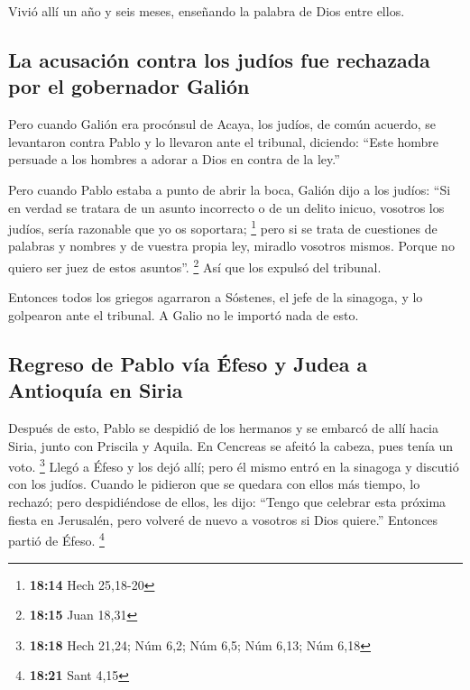 \begin{paracol}{2}
 Vivió allí un año y seis meses, enseñando la palabra de
Dios entre ellos.

\hypertarget{la-acusaciuxf3n-contra-los-juduxedos-fue-rechazada-por-el-gobernador-galiuxf3n}{%
\subsection{La acusación contra los judíos fue rechazada por el
gobernador
Galión}\label{la-acusaciuxf3n-contra-los-juduxedos-fue-rechazada-por-el-gobernador-galiuxf3n}}

 Pero cuando Galión era procónsul de Acaya, los judíos,
de común acuerdo, se levantaron contra Pablo y lo llevaron ante el
tribunal,  diciendo: ``Este hombre persuade a los hombres
a adorar a Dios en contra de la ley.''

 Pero cuando Pablo estaba a punto de abrir la boca,
Galión dijo a los judíos: ``Si en verdad se tratara de un asunto
incorrecto o de un delito inicuo, vosotros los judíos, sería razonable
que yo os soportara; \footnote{\textbf{18:14} Hech 25,18-20}
 pero si se trata de cuestiones de palabras y nombres y
de vuestra propia ley, miradlo vosotros mismos. Porque no quiero ser
juez de estos asuntos''. \footnote{\textbf{18:15} Juan 18,31}
 Así que los expulsó del tribunal.

 Entonces todos los griegos agarraron a Sóstenes, el jefe
de la sinagoga, y lo golpearon ante el tribunal. A Galio no le importó
nada de esto.

\hypertarget{regreso-de-pablo-vuxeda-uxe9feso-y-judea-a-antioquuxeda-en-siria}{%
\subsection{Regreso de Pablo vía Éfeso y Judea a Antioquía en
Siria}\label{regreso-de-pablo-vuxeda-uxe9feso-y-judea-a-antioquuxeda-en-siria}}

 Después de esto, Pablo se despidió de los hermanos y se
embarcó de allí hacia Siria, junto con Priscila y Aquila. En Cencreas se
afeitó la cabeza, pues tenía un voto. \footnote{\textbf{18:18} Hech
  21,24; Núm 6,2; Núm 6,5; Núm 6,13; Núm 6,18}  Llegó a
Éfeso y los dejó allí; pero él mismo entró en la sinagoga y discutió con
los judíos.  Cuando le pidieron que se quedara con ellos
más tiempo, lo rechazó;  pero despidiéndose de ellos, les
dijo: ``Tengo que celebrar esta próxima fiesta en Jerusalén, pero
volveré de nuevo a vosotros si Dios quiere.'' Entonces partió de Éfeso.
\footnote{\textbf{18:21} Sant 4,15}


\end{paracol}
